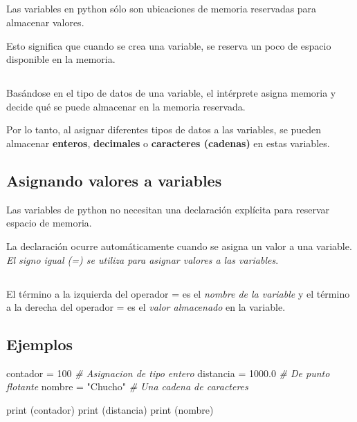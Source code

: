 \documentclass[]{article}
\newenvironment{Shaded}{}{}
\newcommand{\DecValTok}[1]{\textcolor[rgb]{0.25,0.63,0.44}{#1}}
\newcommand{\FloatTok}[1]{\textcolor[rgb]{0.25,0.63,0.44}{#1}}
\newcommand{\StringTok}[1]{\textcolor[rgb]{0.25,0.44,0.63}{#1}}
\newcommand{\CommentTok}[1]{\textcolor[rgb]{0.38,0.63,0.69}{\textit{#1}}}
\newcommand{\OperatorTok}[1]{\textcolor[rgb]{0.40,0.40,0.40}{#1}}
\newcommand{\BuiltInTok}[1]{#1}
\newcommand{\NormalTok}[1]{#1}
\begin{document}
\subsection{}\label{section-8}

Las variables en python sólo son ubicaciones de memoria reservadas para
almacenar valores.

Esto significa que cuando se crea una variable, se reserva un poco de
espacio disponible en la memoria.

\subsection{}\label{section-9}

Basándose en el tipo de datos de una variable, el intérprete asigna
memoria y decide qué se puede almacenar en la memoria reservada.

Por lo tanto, al asignar diferentes tipos de datos a las variables, se
pueden almacenar \textbf{enteros}, \textbf{decimales} o
\textbf{caracteres (cadenas)} en estas variables.

\subsection{Asignando valores a
variables}\label{asignando-valores-a-variables}

Las variables de python no necesitan una declaración explícita para
reservar espacio de memoria.

La declaración ocurre automáticamente cuando se asigna un valor a una
variable. \emph{El signo igual (=) se utiliza para asignar valores a las
variables}.

\subsection{}\label{section-10}

El término a la izquierda del operador = es el \emph{nombre de la
variable} y el término a la derecha del operador = es el \emph{valor
almacenado} en la variable.

\subsection{Ejemplos}\label{ejemplos}

\begin{Shaded}
\begin{Highlighting}[]
\NormalTok{contador }\OperatorTok{=} \DecValTok{100}          \CommentTok{# Asignacion de tipo entero}
\NormalTok{distancia }\OperatorTok{=} \FloatTok{1000.0}      \CommentTok{# De punto flotante}
\NormalTok{nombre }\OperatorTok{=} \StringTok{"Chucho"}       \CommentTok{# Una cadena de caracteres}

\BuiltInTok{print}\NormalTok{ (contador)}
\BuiltInTok{print}\NormalTok{ (distancia)}
\BuiltInTok{print}\NormalTok{ (nombre)}
\end{Highlighting}
\end{Shaded}
\end{document}
